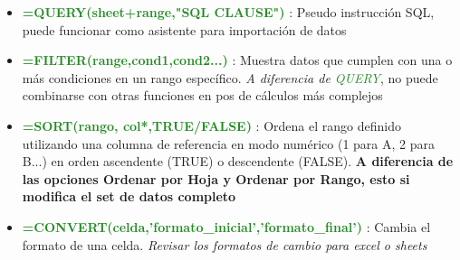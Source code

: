 \begin{itemize}
    \item {\textcolor{ForestGreen}{\textbf{=QUERY(sheet+range,"SQL CLAUSE")}} : Pseudo instrucción SQL, puede funcionar como asistente para importación de datos}
    \item {\textcolor{ForestGreen}{\textbf{=FILTER(range,cond1,cond2...)}} : Muestra datos que cumplen con una o más condiciones en un rango específico. \textit{A diferencia de \textcolor{ForestGreen}{QUERY}}, no puede combinarse con otras funciones en pos de cálculos más complejos}
    \item {\textcolor{ForestGreen}{\textbf{=SORT(rango, col*,TRUE/FALSE)}} : Ordena el rango definido utilizando una columna de referencia en modo numérico (1 para A, 2 para B...) en orden ascendente (TRUE) o descendente (FALSE). \textbf{A diferencia de las opciones Ordenar por Hoja y Ordenar por Rango, esto si modifica el set de datos completo}}
    \item {\textcolor{ForestGreen}{\textbf{=CONVERT(celda,'formato\_inicial','formato\_final')}} : Cambia el formato de una celda. \textit{Revisar los formatos de cambio para excel o sheets}}
\end{itemize}

